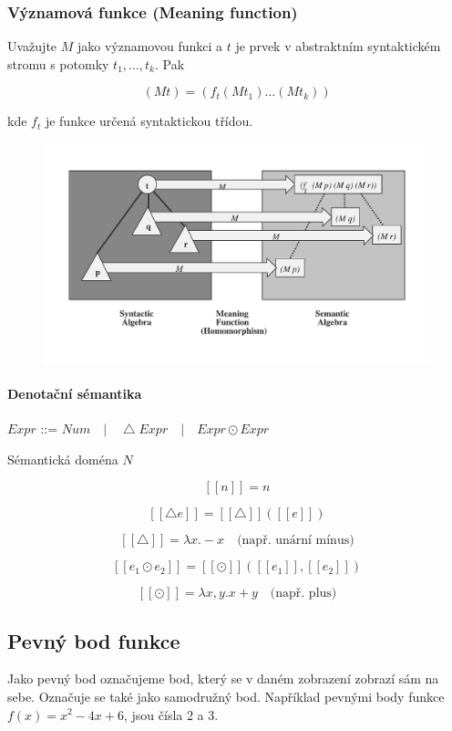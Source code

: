 \subsubsection{Významová funkce (Meaning function)}
Uvažujte $M$ jako významovou funkci a $t$ je prvek v abstraktním syntaktickém stromu s potomky $t_1, \hdots, t_k$. Pak

$$(M t) = (f_t (M t_1) \hdots (M t_k))$$

kde $f_t$ je funkce určená syntaktickou třídou.

\begin{figure}[h!]
\centering
\includegraphics[width=125mm]{01/images/tpj-homo}
\end{figure}

\paragraph{Denotační sémantika} $Expr $ ::= $ Num \quad | \quad \bigtriangleup Expr \quad | \quad Expr \odot Expr$

\noindent Sémantická doména $N$

$$[\![n]\!] = n$$

$$[\![\bigtriangleup e]\!] = [\![\bigtriangleup]\!]([\![e]\!])$$

$$[\![\bigtriangleup]\!] = \lambda x.-x \quad \text{(např. unární mínus)}$$

$$[\![e_1 \odot e_2]\!] = [\![\odot]\!]([\![e_1]\!], [\![e_2]\!])$$

$$[\![\odot]\!] = \lambda x,y.x+y \quad \text{(např. plus)}$$

\subsection{Pevný bod funkce}
Jako pevný bod označujeme bod, který se v daném zobrazení zobrazí sám na sebe. Označuje se také jako samodružný bod. Například pevnými body funkce $f(x)=x^2-4x+6$, jsou čísla 2 a 3.

